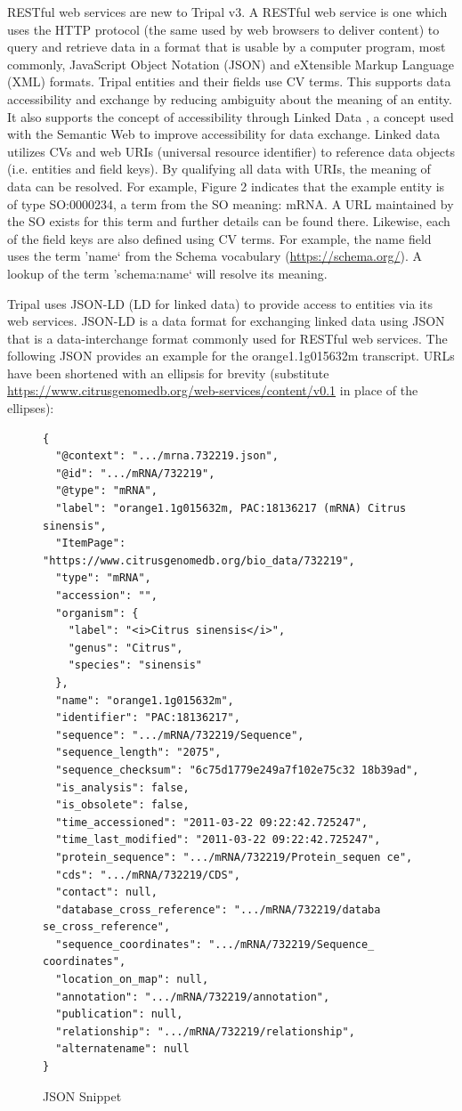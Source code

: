 RESTful web services are new to Tripal v3. A RESTful web service is one which uses the HTTP protocol (the same used by web browsers to deliver content) to query and retrieve data in a format that is usable by a computer program, most commonly, JavaScript Object Notation (JSON) and eXtensible Markup Language (XML) formats. Tripal entities and their fields use CV terms. This supports data accessibility and exchange by reducing ambiguity about the meaning of an entity. It also supports the concept of accessibility through Linked Data \cite{heath2011linked,bizer2011linked}, a concept used with the Semantic Web \cite{Berners_Lee_2001} to improve accessibility for data exchange. Linked data utilizes CVs and web URIs (universal resource identifier) to reference data objects (i.e. entities and field keys). By qualifying all data with URIs, the meaning of data can be resolved. For example, Figure 2 indicates that the example entity is of type SO:0000234, a term from the SO meaning: mRNA. A URL maintained by the SO exists for this term and further details can be found there. Likewise, each of the field keys are also defined using CV terms. For example, the name field uses the term 'name` from the Schema vocabulary (\url{https://schema.org/}). A lookup of the term 'schema:name` will resolve its meaning.

Tripal uses JSON-LD \cite{W3C_2014} (LD for linked data) to provide access to entities via its web services. JSON-LD is a data format for exchanging linked data using JSON that is a data-interchange format commonly used for RESTful web services. The following JSON provides an example for the orange1.1g015632m transcript. URLs have been shortened with an ellipsis for brevity (substitute \url{https://www.citrusgenomedb.org/web-services/content/v0.1} in place of the ellipses):


\begin{figure}[!ht]
\centering
\begin{lstlisting}
{
  "@context": ".../mrna.732219.json",
  "@id": ".../mRNA/732219",
  "@type": "mRNA",
  "label": "orange1.1g015632m, PAC:18136217 (mRNA) Citrus sinensis",
  "ItemPage": "https://www.citrusgenomedb.org/bio_data/732219",
  "type": "mRNA",
  "accession": "",
  "organism": {
    "label": "<i>Citrus sinensis</i>",
    "genus": "Citrus",
    "species": "sinensis"
  },
  "name": "orange1.1g015632m",
  "identifier": "PAC:18136217",
  "sequence": ".../mRNA/732219/Sequence",
  "sequence_length": "2075",
  "sequence_checksum": "6c75d1779e249a7f102e75c32 18b39ad",
  "is_analysis": false,
  "is_obsolete": false,
  "time_accessioned": "2011-03-22 09:22:42.725247",
  "time_last_modified": "2011-03-22 09:22:42.725247",
  "protein_sequence": ".../mRNA/732219/Protein_sequen ce",
  "cds": ".../mRNA/732219/CDS",
  "contact": null,
  "database_cross_reference": ".../mRNA/732219/databa se_cross_reference",
  "sequence_coordinates": ".../mRNA/732219/Sequence_ coordinates",
  "location_on_map": null,
  "annotation": ".../mRNA/732219/annotation",
  "publication": null,
  "relationship": ".../mRNA/732219/relationship",
  "alternatename": null
}
\end{lstlisting}
\caption{JSON Snippet}
\end{figure}

